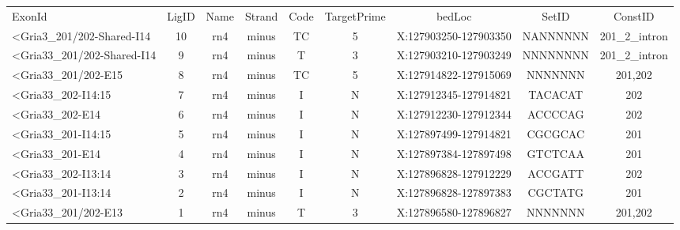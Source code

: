\footnotesize
\begin{tabular}{lcccccccc}
ExonId                                                                          & LigID & Name    & Strand & Code & TargetPrime & bedLoc & SetID & ConstID \\
<Gria3\_201/202-Shared-I14                                                        & 10        & rn4 & minus  & TC                   & 5                       & X:127903250-127903350 & NANNNNNN        & 201\_2\_intron    \\
<Gria33\_201/202-Shared-I14                                                        & 9         & rn4 & minus  & T                    & 3                       & X:127903210-127903249 & NNNNNNNN        & 201\_2\_intron    \\
<Gria33\_201/202-E15                                                               & 8         & rn4 & minus  & TC                   & 5                       & X:127914822-127915069 & NNNNNNN         & 201,202           \\
<Gria33\_202-I14:15                                                                & 7         & rn4 & minus  & I                    & N                       & X:127912345-127914821 & TACACAT         & 202               \\
<Gria33\_202-E14                                                                   & 6         & rn4 & minus  & I                    & N                       & X:127912230-127912344 & ACCCCAG         & 202               \\
<Gria33\_201-I14:15                                                                & 5         & rn4 & minus  & I                    & N                       & X:127897499-127914821 & CGCGCAC         & 201               \\
<Gria33\_201-E14                                                                   & 4         & rn4 & minus  & I                    & N                       & X:127897384-127897498 & GTCTCAA         & 201               \\
<Gria33\_202-I13:14                                                                & 3         & rn4 & minus  & I                    & N                       & X:127896828-127912229 & ACCGATT         & 202               \\
<Gria33\_201-I13:14                                                                & 2         & rn4 & minus  & I                    & N                       & X:127896828-127897383 & CGCTATG         & 201               \\
<Gria33\_201/202-E13                                                               & 1         & rn4 & minus  & T                    & 3                       & X:127896580-127896827 & NNNNNNN         & 201,202          
\end{tabular}
